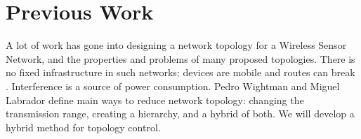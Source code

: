 \documentclass{sigcomm-alternate}
\begin{document}



\section{Previous Work}


A lot of work has gone into designing a network topology for a Wireless Sensor Network, and the properties and problems of many proposed topologies. There is no fixed infrastructure in such networks; devices are mobile and routes can break \cite{tcpp}. Interference is a source of power consumption. Pedro Wightman and Miguel Labrador define main ways to reduce network topology: changing the transmission range, creating a hierarchy, and a hybrid of both. We will develop a hybrid method for topology control.



\end{document}
